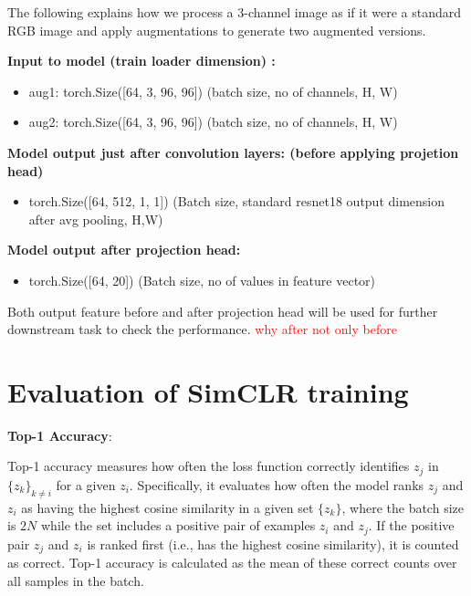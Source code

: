 The following explains how we process a 3-channel image as if it were a standard RGB image and apply augmentations to generate two augmented versions.

\textbf{Input to model (train loader dimension) :} 

\begin{itemize}
  \item aug1: torch.Size([64, 3, 96, 96])        (batch size, no of channels, H, W)
  \item aug2: torch.Size([64, 3, 96, 96])        (batch size, no of channels, H, W) \vspace{1em}
\end{itemize} \vspace{1em}
\textbf{Model output just after convolution layers: (before applying projetion head)} 
\begin{itemize}
  \item torch.Size([64, 512, 1, 1]) (Batch size, standard resnet18 output dimension after avg pooling, H,W)   
\end{itemize}

\textbf{Model output after projection head:}
\begin{itemize}
  \item torch.Size([64, 20])  (Batch size, no of values in feature vector)  
\end{itemize}

Both output feature before and after projection head will be used for further downstream task to check the performance.
\textcolor{red}{why after not only before}
\section{Evaluation of SimCLR training} \label{sec:Evaluation result of SImclr}

\textbf{Top-1 Accuracy}:

Top-1 accuracy measures how often the loss function correctly identifies \( z_j \) in \( \{ z_k \}_{k \neq i} \) for a given \( z_i \). Specifically, it evaluates how often the model
 ranks \( z_j \) and \( z_i \) as having the highest cosine similarity in a given set \( \{ z_k \} \), where the batch size is \( 2N \) while the set includes a positive pair of 
 examples \( z_i \) and \( z_j \).  
If the positive pair \( z_j \) and \( z_i \) is ranked first (i.e., has the highest cosine similarity), it is counted as correct. Top-1 accuracy is calculated as the mean of these correct
 counts over all samples in the batch.  

